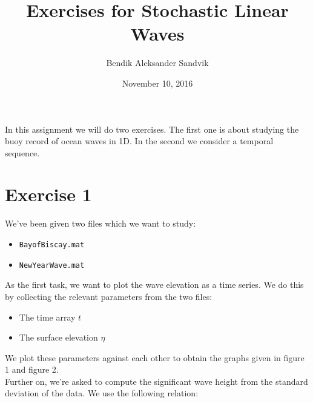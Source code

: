 \documentclass[12pt]{article}
\begin{document}
\title{Exercises for Stochastic Linear Waves}
\date{November 10, 2016}
\author{Bendik Aleksander Sandvik\\}
\maketitle 
In this assignment we will do two exercises. The first one is about studying the buoy record of ocean waves in 1D. In the second we consider a temporal sequence.

\section{Exercise 1}

We've been given two files which we want to study:
\begin{itemize}
\item \verb|BayofBiscay.mat|
\item \verb|NewYearWave.mat|
\end{itemize}
As the first task, we want to plot the wave elevation as a time series. We do this by collecting the relevant parameters from the two files: 
\begin{itemize}
\item The time array $t$
\item The surface elevation $\eta$
\end{itemize}
We plot these parameters against each other to obtain the graphs given in figure 1 and figure 2.\\
Further on, we're asked to compute the significant wave height from the standard deviation of the data. We use the following relation:
\end{document}
